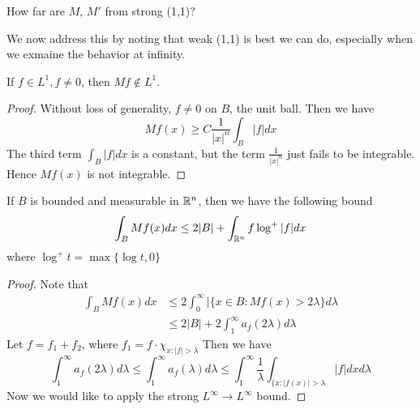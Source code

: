 \begin{problem}
    How far are $M$, $M'$ from strong (1,1)?
\end{problem}
We now address this by noting that weak (1,1) is best we can do, especially when we exmaine the behavior at infinity.
\begin{proposition}
    If $f\in L^1, f\neq 0$, then $Mf\not\in L^1$.
\end{proposition}
\begin{proof}
    Without loss of generality, $f\neq 0$ on $B$, the unit ball. Then we have
    \begin{equation*}
        Mf(x)\geq C\frac{1}{|x|^n}\int_{B}|f|dx
    \end{equation*}
    The third term $\int_B|f|dx$ is a constant, but the term $\frac{1}{|x|^n}$ just fails to be integrable. Hence $Mf(x)$ is not integrable.
\end{proof}

\begin{theorem}
    If $B$ is bounded and measurable in $\mathbb{R}^n$, then we have the following bound
    \begin{equation*}
        \int_BMf(x)dx\leq 2|B|+\int_{\mathbb{R}^n}f\log^+|f|dx
    \end{equation*}
    where $\log^+t=\max{\{\log t, 0\}}$
\end{theorem}
\begin{proof}
    Note that
    \begin{align*}
        \int_BMf(x)dx&\leq 2\int_0^\infty|\{x\in B: Mf(x)>2\lambda\}d\lambda\\
        &\leq 2|B|+2\int_1^\infty a_f(2\lambda)d\lambda
    \end{align*}
    Let $f=f_1+f_2$, where $f_1=f\cdot\chi_{x:|f|>\lambda}$
    Then we have
    \begin{equation*}
        \int_1^\infty a_f(2\lambda)d\lambda\leq \int_1^\infty a_f(\lambda)d\lambda\leq\int_1^\infty\frac{1}{\lambda}\int_{\{x: |f(x)|>\lambda}|f|dxd\lambda
    \end{equation*}
    Now we would like to apply the strong $L^\infty\to L^\infty$ bound.
\end{proof}

